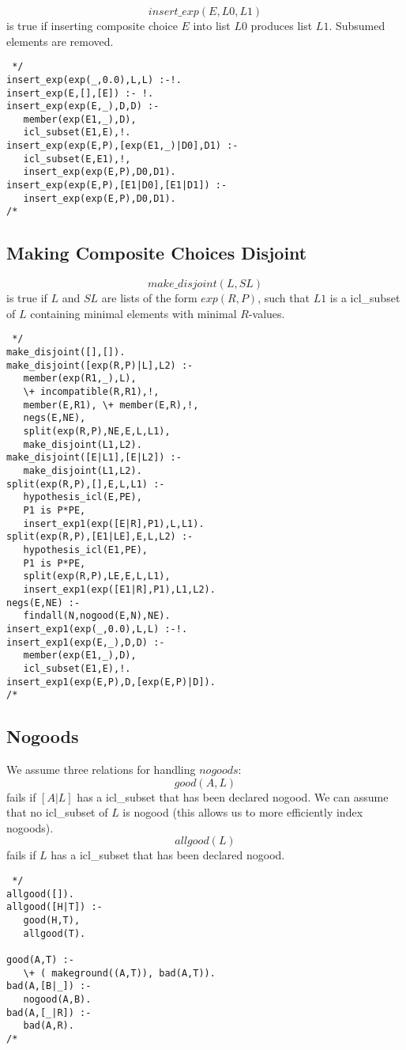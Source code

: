\documentclass[11pt,fleqn]{article}
\begin{document}
\[insert\_exp(E,L0,L1)\]
is true if inserting composite choice $E$ into list $L0$ 
produces list $L1$. Subsumed elements are removed.
\begin{verbatim} */
insert_exp(exp(_,0.0),L,L) :-!.
insert_exp(E,[],[E]) :- !.
insert_exp(exp(E,_),D,D) :-
   member(exp(E1,_),D),
   icl_subset(E1,E),!.
insert_exp(exp(E,P),[exp(E1,_)|D0],D1) :-
   icl_subset(E,E1),!,
   insert_exp(exp(E,P),D0,D1).
insert_exp(exp(E,P),[E1|D0],[E1|D1]) :-
   insert_exp(exp(E,P),D0,D1).
/* \end{verbatim}

\subsection{Making Composite Choices Disjoint}

\[make\_disjoint(L,SL)\]
is true if $L$ and $SL$ are lists of the form $exp(R,P)$, such that
$L1$ is a icl_subset of $L$ containing minimal elements with minimal
$R$-values.
\begin{verbatim} */
make_disjoint([],[]).
make_disjoint([exp(R,P)|L],L2) :-
   member(exp(R1,_),L),
   \+ incompatible(R,R1),!,
   member(E,R1), \+ member(E,R),!,
   negs(E,NE),
   split(exp(R,P),NE,E,L,L1),
   make_disjoint(L1,L2).
make_disjoint([E|L1],[E|L2]) :-
   make_disjoint(L1,L2).
split(exp(R,P),[],E,L,L1) :-
   hypothesis_icl(E,PE),
   P1 is P*PE,
   insert_exp1(exp([E|R],P1),L,L1).
split(exp(R,P),[E1|LE],E,L,L2) :-
   hypothesis_icl(E1,PE),
   P1 is P*PE,
   split(exp(R,P),LE,E,L,L1),
   insert_exp1(exp([E1|R],P1),L1,L2).
negs(E,NE) :-
   findall(N,nogood(E,N),NE).
insert_exp1(exp(_,0.0),L,L) :-!.
insert_exp1(exp(E,_),D,D) :-
   member(exp(E1,_),D),
   icl_subset(E1,E),!.
insert_exp1(exp(E,P),D,[exp(E,P)|D]).
/* \end{verbatim}

\subsection{Nogoods}
We assume three relations for handling $nogoods$:
\[good(A,L)\]
fails if $[A|L]$ has a icl_subset that has been declared nogood. We can
assume that no icl_subset of $L$ is nogood (this allows us to more
efficiently index nogoods).
\[allgood(L)\]
fails if $L$ has a icl_subset that has been declared nogood.
\begin{verbatim} */
allgood([]).
allgood([H|T]) :-
   good(H,T),
   allgood(T).

good(A,T) :-
   \+ ( makeground((A,T)), bad(A,T)).
bad(A,[B|_]) :-
   nogood(A,B).
bad(A,[_|R]) :-
   bad(A,R).
/* \end{verbatim}
\end{document}

